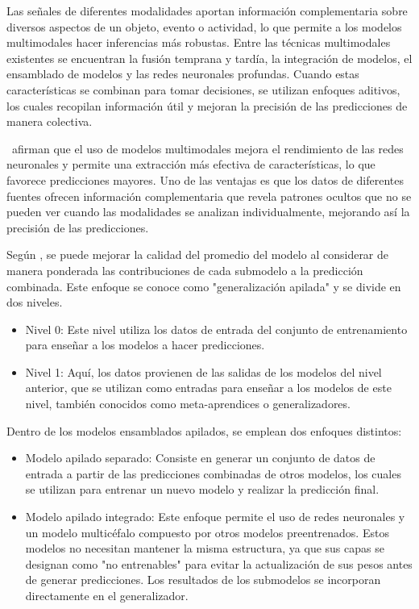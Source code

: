 Las señales de diferentes modalidades aportan información complementaria sobre diversos aspectos de un objeto, evento o actividad, lo que permite a los modelos multimodales hacer inferencias más robustas. Entre las técnicas multimodales existentes se encuentran la fusión temprana y tardía, la integración de modelos, el ensamblado de modelos y las redes neuronales profundas. Cuando estas características se combinan para tomar decisiones, se utilizan enfoques aditivos, los cuales recopilan información útil y mejoran la precisión de las predicciones de manera colectiva. \parencite{bk_deng2018deeplearningnlp}

\cite{tec_baheti2020introduction_mdl} afirman que el uso de modelos multimodales mejora el rendimiento de las redes neuronales y permite una extracción más efectiva de características, lo que favorece predicciones mayores. Uno de las ventajas es que los datos de diferentes fuentes ofrecen información complementaria que revela patrones ocultos que no se pueden ver cuando las modalidades se analizan individualmente, mejorando así la precisión de las predicciones.

Según \cite{tec_brownlee2018stacked_models}, se puede mejorar la calidad del promedio del modelo al considerar de manera ponderada las contribuciones de cada submodelo a la predicción combinada. Este enfoque se conoce como "generalización apilada" y se divide en dos niveles.

\begin{itemize}
    \item Nivel 0: Este nivel utiliza los datos de entrada del conjunto de entrenamiento para enseñar a los modelos a hacer predicciones.
    \item Nivel 1: Aquí, los datos provienen de las salidas de los modelos del nivel anterior, que se utilizan como entradas para enseñar a los modelos de este nivel, también conocidos como meta-aprendices o generalizadores.
\end{itemize}

Dentro de los modelos ensamblados apilados, se emplean dos enfoques distintos:

\begin{itemize}
    \item Modelo apilado separado: Consiste en generar un conjunto de datos de entrada a partir de las predicciones combinadas de otros modelos, los cuales se utilizan para entrenar un nuevo modelo y realizar la predicción final.
    \item Modelo apilado integrado: Este enfoque permite el uso de redes neuronales y un modelo multicéfalo compuesto por otros modelos preentrenados. Estos modelos no necesitan mantener la misma estructura, ya que sus capas se designan como "no entrenables" para evitar la actualización de sus pesos antes de generar predicciones. Los resultados de los submodelos se incorporan directamente en el generalizador.
\end{itemize}

